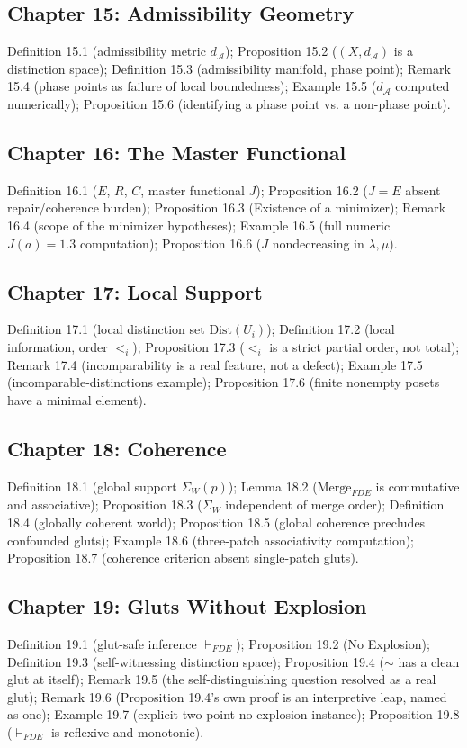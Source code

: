 \documentclass[11pt]{book}
\begin{document}
\subsection*{Chapter 15: Admissibility Geometry}
Definition 15.1 (admissibility metric $d_{\mathcal A}$); Proposition 15.2 ($(X,d_{\mathcal A})$ is a distinction space); Definition 15.3 (admissibility manifold, phase point); Remark 15.4 (phase points as failure of local boundedness); Example 15.5 ($d_{\mathcal A}$ computed numerically); Proposition 15.6 (identifying a phase point vs. a non-phase point).

\subsection*{Chapter 16: The Master Functional}
Definition 16.1 ($E$, $R$, $C$, master functional $J$); Proposition 16.2 ($J=E$ absent repair/coherence burden); Proposition 16.3 (Existence of a minimizer); Remark 16.4 (scope of the minimizer hypotheses); Example 16.5 (full numeric $J(a)=1.3$ computation); Proposition 16.6 ($J$ nondecreasing in $\lambda,\mu$).

\subsection*{Chapter 17: Local Support}
Definition 17.1 (local distinction set $\mathrm{Dist}(U_i)$); Definition 17.2 (local information, order $<_i$); Proposition 17.3 ($<_i$ is a strict partial order, not total); Remark 17.4 (incomparability is a real feature, not a defect); Example 17.5 (incomparable-distinctions example); Proposition 17.6 (finite nonempty posets have a minimal element).

\subsection*{Chapter 18: Coherence}
Definition 18.1 (global support $\Sigma_W(p)$); Lemma 18.2 ($\mathrm{Merge}_{FDE}$ is commutative and associative); Proposition 18.3 ($\Sigma_W$ independent of merge order); Definition 18.4 (globally coherent world); Proposition 18.5 (global coherence precludes confounded gluts); Example 18.6 (three-patch associativity computation); Proposition 18.7 (coherence criterion absent single-patch gluts).

\subsection*{Chapter 19: Gluts Without Explosion}
Definition 19.1 (glut-safe inference $\vdash_{FDE}$); Proposition 19.2 (No Explosion); Definition 19.3 (self-witnessing distinction space); Proposition 19.4 ($\sim$ has a clean glut at itself); Remark 19.5 (the self-distinguishing question resolved as a real glut); Remark 19.6 (Proposition 19.4's own proof is an interpretive leap, named as one); Example 19.7 (explicit two-point no-explosion instance); Proposition 19.8 ($\vdash_{FDE}$ is reflexive and monotonic).
\end{document}
